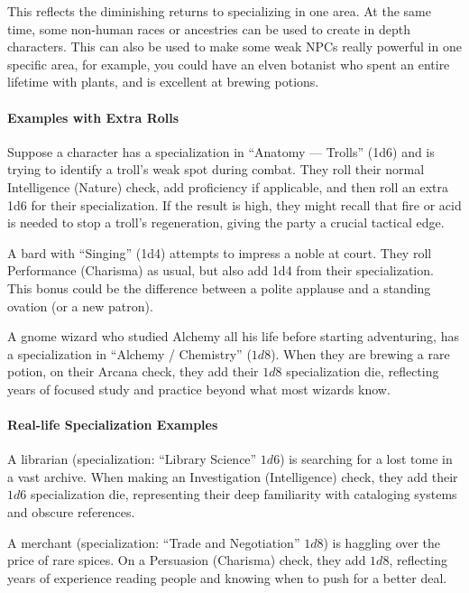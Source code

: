 \documentclass[twocolumn]{dndbook}
\begin{document}
This reflects the diminishing returns to specializing in one area.
At the same time, some non-human races or ancestries can be used to create in depth characters.
This can also be used to make some weak NPCs really powerful in one specific area,
for example, you could have an elven botanist who spent an entire lifetime with plants, and is excellent at brewing potions.\par

\paragraph*{Examples with Extra Rolls}
Suppose a character has a specialization in ``Anatomy --- Trolls'' (1d6) and is trying to identify a troll’s weak spot during combat.
They roll their normal Intelligence (Nature) check, add proficiency if applicable, and then roll an extra 1d6 for their specialization.
If the result is high, they might recall that fire or acid is needed to stop a troll’s regeneration, giving the party a crucial tactical edge.\par


A bard with ``Singing'' (1d4) attempts to impress a noble at court.
They roll Performance (Charisma) as usual, but also add 1d4 from their specialization.
This bonus could be the difference between a polite applause and a standing ovation (or a new patron).\par

A gnome wizard who studied Alchemy all his life before starting adventuring, has a specialization in ``Alchemy / Chemistry'' ($1d8$).
When they are brewing a rare potion, on their Arcana check, they add their $1d8$ specialization die, reflecting years of focused study and practice beyond what most wizards know.\par

\paragraph*{Real-life Specialization Examples}
A librarian (specialization: ``Library Science'' $1d6$) is searching for a lost tome in a vast archive.
When making an Investigation (Intelligence) check, they add their $1d6$ specialization die, representing their deep familiarity with cataloging systems and obscure references.\par

A merchant (specialization: ``Trade and Negotiation'' $1d8$) is haggling over the price of rare spices.
On a Persuasion (Charisma) check, they add $1d8$, reflecting years of experience reading people and knowing when to push for a better deal.\par
\end{document}
